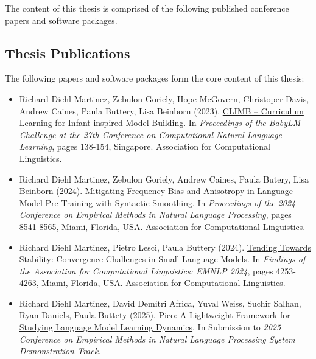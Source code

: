 The content of this thesis is comprised of the following published conference papers and software packages.

\begin{tcolorbox}[
    enhanced,
    colback=white,
    colframe=thesisblue,
    arc=0mm,
    boxrule=1pt,
    left=10pt,
    right=10pt,
    top=10pt,
    bottom=10pt,
    title=Published Works,
    fonttitle=\bfseries,
    coltitle=white
]
\subsection*{Thesis Publications}
The following papers and software packages form the core content of this thesis:

\begin{itemize}
    \item Richard Diehl Martinez, Zebulon Goriely, Hope McGovern, Christoper Davis, Andrew Caines, Paula Buttery, Lisa Beinborn (2023). {\color{thesisblue}\href{https://aclanthology.org/2023.conll-1.10/}{CLIMB – Curriculum Learning for Infant-inspired Model Building}}. In \emph{Proceedings of the BabyLM Challenge at the 27th Conference on Computational Natural Language Learning}, pages 138-154, Singapore. Association for Computational Linguistics.

    \item Richard Diehl Martinez, Zebulon Goriely, Andrew Caines, Paula Butery, Lisa Beinborn (2024). {\color{thesisblue}\href{https://aclanthology.org/2024.emnlp-main.486/}{Mitigating Frequency Bias and Anisotropy in Language Model Pre-Training with Syntactic Smoothing}}. In \emph{Proceedings of the 2024 Conference on Empirical Methods in Natural Language Processing}, pages 8541-8565, Miami, Florida, USA. Association for Computational Linguistics.

    \item Richard Diehl Martinez, Pietro Lesci, Paula Buttery (2024). {\color{thesisblue}\href{https://aclanthology.org/2024.findings-emnlp.246/}{Tending Towards Stability: Convergence Challenges in Small Language Models}}. In \emph{Findings of the Association for Computational Linguistics: EMNLP 2024}, pages 4253-4263, Miami, Florida, USA. Association for Computational Linguistics.

    \item Richard Diehl Martinez, David Demitri Africa, Yuval Weiss, Suchir Salhan, Ryan Daniels, Paula Buttety (2025). {\color{thesisblue}\href{https://github.com/pico-lm}{Pico: A Lightweight Framework for Studying Language Model Learning Dynamics}}. In Submission to \emph{2025 Conference on Empirical Methods in Natural Language Processing System Demonstration Track}.
\end{itemize}
\end{tcolorbox}

